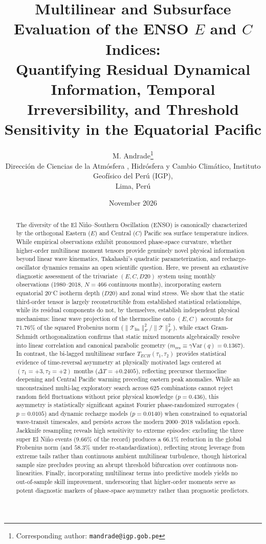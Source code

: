 \documentclass[11pt,a4paper]{article}
\title{\textbf{Multilinear and Subsurface Evaluation of the ENSO $E$ and $C$ Indices:\\ Quantifying Residual Dynamical Information, Temporal Irreversibility, and Threshold Sensitivity in the Equatorial Pacific}}
\author{M. Andrade\thanks{Corresponding author: \texttt{mandrade@igp.gob.pe}} \\
\small Direcci\'on de Ciencias de la Atm\'osfera , Hidr\'osfera y Cambio Clim\'atico, Instituto Geof\'isico del Per\'u (IGP),\\
Lima, Per\'u 
}
\date{November 2026}
\begin{document}
\maketitle

\begin{abstract}
The diversity of the El Ni\~no--Southern Oscillation (ENSO) is canonically characterized by the orthogonal Eastern ($E$) and Central ($C$) Pacific sea surface temperature indices. While empirical observations exhibit pronounced phase-space curvature, whether higher-order multilinear moment tensors provide genuinely novel physical information beyond linear wave kinematics, Takahashi's quadratic parameterization, and recharge-oscillator dynamics remains an open scientific question. Here, we present an exhaustive diagnostic assessment of the trivariate $(E, C, D20)$ system using monthly observations (1980--2018, $N = 466$ continuous months), incorporating eastern equatorial 20$^\circ$C isotherm depth ($D20$) and zonal wind stress. We show that the static third-order tensor is largely reconstructible from established statistical relationships, while its residual components do not, by themselves, establish independent physical mechanisms: linear wave projection of the thermocline onto $(E, C)$ accounts for $71.76\%$ of the squared Frobenius norm ($\|\mathcal{T}_{\mathrm{lin}}\|_F^2 / \|\mathcal{T}\|_F^2$), while exact Gram-Schmidt orthogonalization confirms that static mixed moments algebraically resolve into linear correlation and canonical parabolic geometry ($m_{\mathrm{res}} \equiv \gamma \mathrm{Var}(q) = 0.1367$). In contrast, the bi-lagged multilinear surface $T_{ECH}(\tau_1, \tau_2)$ provides statistical evidence of time-reversal asymmetry at physically motivated lags centered at $(\tau_1 = +3, \tau_2 = +2)$ months ($\Delta T = +0.2405$), reflecting precursor thermocline deepening and Central Pacific warming preceding eastern peak anomalies. While an unconstrained multi-lag exploratory search across 625 combinations cannot reject random field fluctuations without prior physical knowledge ($p = 0.436$), this asymmetry is statistically significant against Fourier phase-randomized surrogates ($p = 0.0105$) and dynamic recharge models ($p = 0.0140$) when constrained to equatorial wave-transit timescales, and persists across the modern 2000--2018 validation epoch. Jackknife resampling reveals high sensitivity to extreme episodes: excluding the three super El Ni\~no events ($9.66\%$ of the record) produces a $66.1\%$ reduction in the global Frobenius norm (and $58.3\%$ under re-standardization), reflecting strong leverage from extreme tails rather than continuous ambient multilinear turbulence, though historical sample size precludes proving an abrupt threshold bifurcation over continuous non-linearities. Finally, incorporating multilinear terms into predictive models yields no out-of-sample skill improvement, underscoring that higher-order moments serve as potent diagnostic markers of phase-space asymmetry rather than prognostic predictors.
\end{abstract}
\end{document}
